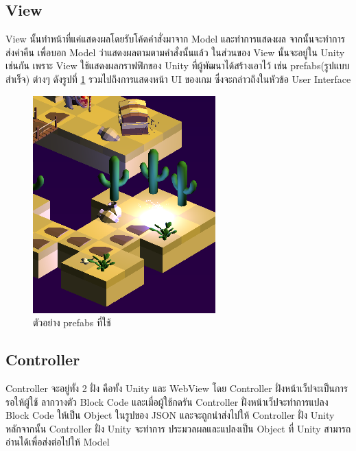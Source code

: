 \subsection{View}
View นั้นทำหน้าที่แค่แสดงผลโดยรับโค้ดคำสั่งมาจาก Model และทำการแสดงผล จากนั้นจะทำการ
ส่งค่าคืน เพื่อบอก Model ว่าแสดงผลตามตามคำสั่งนั้นแล้ว ในส่วนของ View นั้นจะอยู่ใน
Unity เช่นกัน เพราะ View ใช้แสดงผลกราฟฟิกของ Unity ที่ผู้พัฒนาได้สร้างเอาไว้ เช่น prefabs(รูปแบบสำเร็จ) ต่างๆ ดังรูปที่ \ref{prefabs}
รวมไปถึงการแสดงหน้า UI ของเกม ซึ่งจะกล่าวถึงในหัวข้อ User Interface\par

\begin{figure}
    \begin{center}
    \includegraphics{pic/prefap.PNG}
    \end{center}
    \caption[Poem]{ตัวอย่าง prefabs ที่ใช้ }
    \label{prefabs}
    \end{figure}
    


\subsection{Controller}
Controller จะอยู่ทั้ง 2 ฝั่ง คือทั้ง Unity และ WebView โดย Controller ฝั่งหน้าเว็ปจะเป็นการรอให้ผู้ใช้
ลากวางตัว Block Code และเมื่อผู้ใช้กดรัน Controller ฝั่งหน้าเว็ปจะทำการแปลง Block Code ให้เป็น Object 
ในรูปของ JSON และจะถูกนำส่งไปให้ Controller ฝั่ง Unity หลักจากนั้น Controller ฝั่ง Unity จะทำการ
ประมวลผลและแปลงเป็น Object ที่ Unity สามารถอ่านได้เพื่อส่งต่อไปให้ Model

